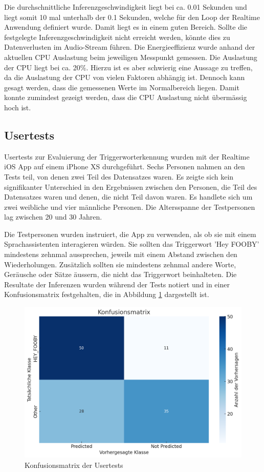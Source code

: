 \documentclass[11pt,a4paper]{article}
\begin{document}
\noindent \newline
Die durchschnittliche Inferenzgeschwindigkeit liegt bei ca. 0.01 Sekunden und liegt somit 10 mal
unterhalb der 0.1 Sekunden, welche für den Loop der Realtime Anwendung definiert wurde. Damit liegt 
es in einem guten Bereich. Sollte die festgelegte Inferenzgeschwindigkeit nicht erreicht werden, 
könnte dies zu Datenverlusten im Audio-Stream führen. Die Energieeffizienz wurde anhand der 
aktuellen CPU Auslastung beim jeweiligen Messpunkt gemessen. Die Auslastung der CPU liegt bei ca. 
20\%. Hierzu ist es aber schwierig eine Aussage zu treffen, da die Auslastung der CPU von vielen 
Faktoren abhängig ist. Dennoch kann gesagt werden, dass die gemessenen Werte im Normalbereich 
liegen. Damit konnte zumindest gezeigt werden, dass die CPU Auslastung nicht übermässig hoch ist. 

\subsection{Usertests}
Usertests zur Evaluierung der Triggerworterkennung wurden mit der Realtime iOS App auf einem iPhone 
XS durchgeführt. Sechs Personen nahmen an den Tests teil, von denen zwei Teil des Datensatzes waren. 
Es zeigte sich kein signifikanter Unterschied in den Ergebnissen zwischen den Personen, die Teil des 
Datensatzes waren und denen, die nicht Teil davon waren. Es handlete sich um zwei weibliche und 
vier männliche Personen. Die Altersspanne der Testpersonen lag zwischen 20 und 30 Jahren.

\noindent \newline
Die Testpersonen wurden instruiert, die App zu verwenden, als ob sie mit einem Sprachassistenten 
interagieren würden. Sie sollten das Triggerwort 'Hey FOOBY' mindestens zehnmal aussprechen, 
jeweils mit einem Abstand zwischen den Wiederholungen. Zusätzlich sollten sie mindestens zehnmal 
andere Worte, Geräusche oder Sätze äussern, die nicht das Triggerwort beinhalteten. Die Resultate 
der Inferenzen wurden während der Tests notiert und in einer Konfusionsmatrix festgehalten, die in 
Abbildung \ref{fig:usertests} dargestellt ist.

\begin{figure}[H]
	\centering
	\includegraphics[width=0.8\linewidth]{img/eval-usertests.png}
	\caption{Konfusionsmatrix der Usertests}
	\label{fig:usertests}
\end{figure}
\end{document}
